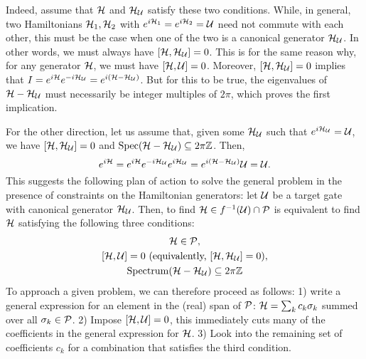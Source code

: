 Indeed, assume that ${\mathcal{H}}$ and ${\mathcal{H}}_{{\mathcal{U}}}$ satisfy these two conditions.
While, in general, two Hamiltonians ${\mathcal{H}}_1,{\mathcal{H}}_2$ with $e^{i{\mathcal{H}}_1}=e^{i{\mathcal{H}}_2}={\mathcal{U}}$ need not commute with each other, this must be the case when one of the two is a canonical generator ${\mathcal{H}}_{{\mathcal{U}}}$. In other words, we must always have $[{\mathcal{H}},{\mathcal{H}}_{{\mathcal{U}}}]=0$.
This is for the same reason why, for any generator ${\mathcal{H}}$, we must have $[{\mathcal{H}},{\mathcal{U}}]=0$.
Moreover, $[{\mathcal{H}},{\mathcal{H}}_{{\mathcal{U}}}]=0$ implies that
$I=e^{i{\mathcal{H}}}e^{-i{\mathcal{H}}_{{\mathcal{U}}}}=e^{i({\mathcal{H}}-{\mathcal{H}}_{{\mathcal{U}}})}$.
But for this to be true, the eigenvalues of ${\mathcal{H}}-{\mathcal{H}}_{{\mathcal{U}}}$ must necessarily be integer multiples of $2\pi$, which proves the first implication.

For the other direction, let us assume that, given some ${\mathcal{H}}_{{\mathcal{U}}}$ such that $e^{i{\mathcal{H}}_{{\mathcal{U}}}}={\mathcal{U}}$, we have $[{\mathcal{H}},{\mathcal{H}}_{{\mathcal{U}}}]=0$ and $\operatorname{Spec}({\mathcal{H}}-{\mathcal{H}}_{{\mathcal{U}}})\subseteq2\pi\mathbb{Z}$.
Then,
\begin{equation}
    e^{i{\mathcal{H}}} =
    e^{i{\mathcal{H}}} e^{-i{\mathcal{H}}_{{\mathcal{U}}}} e^{i{\mathcal{H}}_{{\mathcal{U}}}} =
    e^{i({\mathcal{H}}-{\mathcal{H}}_{{\mathcal{U}}})} {\mathcal{U}} =
    {\mathcal{U}}.
\end{equation}
This suggests the following plan of action to solve the general problem in the presence of constraints on the Hamiltonian generators: let ${\mathcal{U}}$ be a target gate with canonical generator ${\mathcal{H}}_{{\mathcal{U}}}$. Then, to find ${\mathcal{H}}\in f^{-1}({\mathcal{U}})\cap{\mathcal{P}}$ is equivalent to find ${\mathcal{H}}$ satisfying the following three conditions:
\begin{subequations}
\begin{gather}
    \calH\in\calP, \label{eq:3conditions_1st}\\
    [\calH,\calU]=0 \text{ (equivalently, $[\calH,\calH_{\calU}]=0$)}, \label{eq:3conditions_2nd}\\
    \on{Spectrum}(\calH-\calH_{\calU})\subseteq2\pi\ZZ \label{eq:3conditions_3rd}
\end{gather}
\label{eq:3conditions}
\end{subequations}
To approach a given problem, we can therefore proceed as follows:
1) write a general expression for an element in the (real) span of ${\mathcal{P}}$: ${\mathcal{H}}=\sum_k c_k \sigma_k$ summed over all $\sigma_k\in{\mathcal{P}}$.
2) Impose $[{\mathcal{H}},{\mathcal{U}}]=0$, this immediately cuts many of the coefficients in the general expression for ${\mathcal{H}}$.
3) Look into the remaining set of coefficients $c_k$ for a combination that satisfies the third condition.


